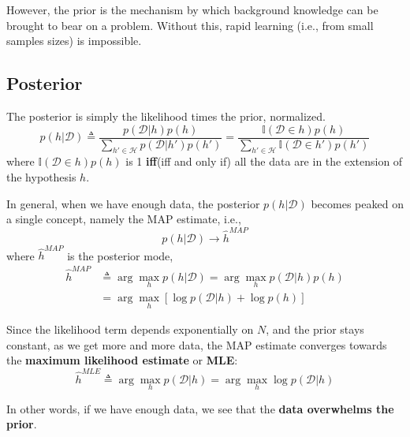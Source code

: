 \begin{refsection}
However, the prior is the mechanism by which background knowledge can be brought to bear on a problem. Without this, rapid learning (i.e., from small samples sizes) is impossible.


\subsection{Posterior}
The posterior is simply the likelihood times the prior, normalized.
\begin{equation}
p(h|\mathcal{D}) \triangleq \dfrac{p(\mathcal{D}|h)p(h)}{\sum_{h' \in \mathcal{H}}p(\mathcal{D}|h')p(h')}=\dfrac{\mathbb{I}(\mathcal{D} \in h)p(h)}{\sum_{h' \in \mathcal{H}}\mathbb{I}(\mathcal{D} \in h')p(h')}
\end{equation}
where $\mathbb{I}(\mathcal{D} \in h)p(h)$ is 1 \textbf{iff}(iff and only if) all the data are in the extension of the hypothesis $h$.

In general, when we have enough data, the posterior $p(h|\mathcal{D})$ becomes peaked on a single concept, namely the MAP estimate, i.e.,
\begin{equation}
p(h|\mathcal{D}) \rightarrow \hat{h}^{MAP}
\end{equation}
where $\hat{h}^{MAP}$ is the posterior mode,
\begin{equation}\begin{split}
\hat{h}^{MAP} & \triangleq \arg\max\limits_h p(h|\mathcal{D})=\arg\max\limits_h p(\mathcal{D}|h)p(h) \\
& =\arg\max\limits_h [\log p(\mathcal{D}|h) + \log p(h)]
\end{split}\end{equation}

Since the likelihood term depends exponentially on $N$, and the prior stays constant, as we get more and more data, the MAP estimate converges towards the \textbf{maximum likelihood estimate} or \textbf{MLE}:
\begin{equation}
\hat{h}^{MLE} \triangleq \arg\max\limits_h p(\mathcal{D}|h)=\arg\max\limits_h \log p(\mathcal{D}|h)
\end{equation}

In other words, if we have enough data, we see that the \textbf{data overwhelms the prior}.



\end{refsection}

